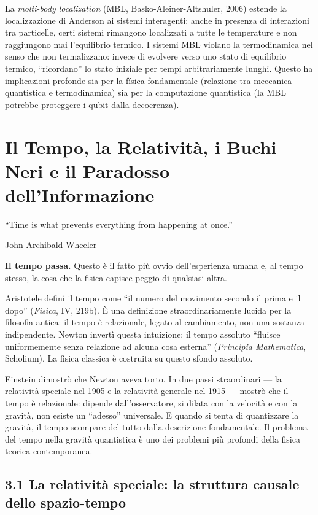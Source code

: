 \documentclass[11.5pt,a4paper,openany]{book}
\theoremstyle{remark}
\begin{document}
La \textit{molti-body localization} (MBL, Basko-Aleiner-Altshuler, 2006) estende la localizzazione di Anderson ai sistemi interagenti: anche in presenza di interazioni tra particelle, certi sistemi rimangono localizzati a tutte le temperature e non raggiungono mai l'equilibrio termico. I sistemi MBL violano la termodinamica nel senso che non termalizzano: invece di evolvere verso uno stato di equilibrio termico, ``ricordano'' lo stato iniziale per tempi arbitrariamente lunghi. Questo ha implicazioni profonde sia per la física fondamentale (relazione tra meccanica quantistica e termodinamica) sia per la computazione quantistica (la MBL potrebbe proteggere i qubit dalla decoerenza).

\chapter{Il Tempo, la Relatività, i Buchi Neri e il Paradosso dell'Informazione}

\epigraph{``Time is what prevents everything from happening at once.''}{John Archibald Wheeler}

\textbf{Il tempo passa.} Questo è il fatto più ovvio dell'esperienza umana e, al tempo stesso, la cosa che la fisica capisce peggio di qualsiasi altra.

Aristotele definì il tempo come ``il numero del movimento secondo il prima e il dopo'' (\textit{Fisica}, IV, 219b). È una definizione straordinariamente lucida per la filosofia antica: il tempo è relazionale, legato al cambiamento, non una sostanza indipendente. Newton invertì questa intuizione: il tempo assoluto ``fluisce uniformemente senza relazione ad alcuna cosa esterna'' (\textit{Principia Mathematica}, Scholium). La fisica classica è costruita su questo sfondo assoluto.

Einstein dimostrò che Newton aveva torto. In due passi straordinari --- la relatività speciale nel 1905 e la relatività generale nel 1915 --- mostrò che il tempo è relazionale: dipende dall'osservatore, si dilata con la velocità e con la gravità, non esiste un ``adesso'' universale. E quando si tenta di quantizzare la gravità, il tempo scompare del tutto dalla descrizione fondamentale. Il problema del tempo nella gravità quantistica è uno dei problemi più profondi della fisica teorica contemporanea.

\section{3.1 La relatività speciale: la struttura causale dello spazio-tempo}
\end{document}
